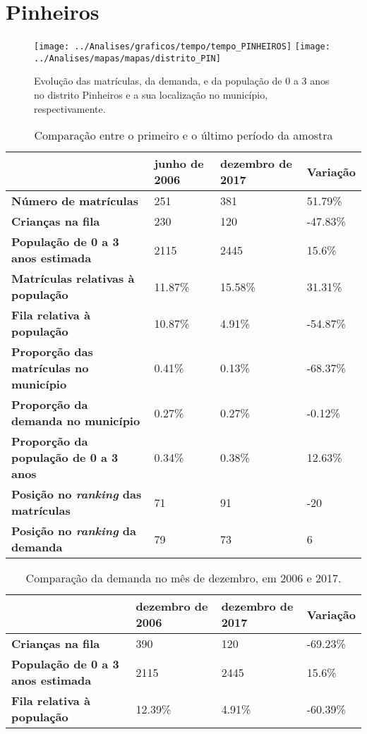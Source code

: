 \section{Pinheiros}
\begin{figure}[H]
	\centering
	\texttt{[image: ../Analises/graficos/tempo/tempo\_PINHEIROS]}
	\texttt{[image: ../Analises/mapas/mapas/distrito\_PIN]}
	\caption{Evolução das matrículas, da demanda, e da população de 0 a 3 anos no distrito Pinheiros e a sua localização no município, respectivamente.}
\end{figure}
\begin{table}[H]
	\begin{tabular}{|l|l|l|l|}
		\hline
		\textbf{}                                      & \textbf{junho de 2006}       & \textbf{dezembro de 2017}    & \textbf{Variação} \\ \hline
		\textbf{Número de matrículas}                  & 251 & 381 & 51.79\% \\ \hline
		\textbf{Crianças na fila}                      & 230 & 120 & -47.83\% \\ \hline
		\textbf{População de 0 a 3 anos estimada}      & 2115 & 2445 & 15.6\% \\ \hline
		\textbf{Matrículas relativas à população}      & 11.87\% & 15.58\% & 31.31\% \\ \hline
		\textbf{Fila relativa à população}             & 10.87\% & 4.91\% & -54.87\% \\ \hline
		\textbf{Proporção das matrículas no município} & 0.41\% & 0.13\% & -68.37\% \\ \hline
		\textbf{Proporção da demanda no município}     & 0.27\% & 0.27\% & -0.12\% \\ \hline
		\textbf{Proporção da população de 0 a 3 anos}  & 0.34\% & 0.38\% & 12.63\% \\ \hline
		\textbf{Posição no \textit{ranking} das matrículas}     & 71 & 91 & -20 \\ \hline
		\textbf{Posição no \textit{ranking} da demanda}         & 79 & 73 & 6 \\ \hline
	\end{tabular}
	\caption{Comparação entre o primeiro e o último período da amostra}
\end{table}
\begin{table}[H]
	\begin{tabular}{|l|l|l|l|}
		\hline
		\textbf{}                                 & \textbf{dezembro de 2006} & \textbf{dezembro de 2017} & \textbf{Variação} \\ \hline
		\textbf{Crianças na fila}                      & 390 & 120 & -69.23\% \\ \hline
		\textbf{População de 0 a 3 anos estimada}      & 2115 & 2445 & 15.6\% \\ \hline
		\textbf{Fila relativa à população}             & 12.39\% & 4.91\% & -60.39\% \\ \hline
	\end{tabular}
	\caption{Comparação da demanda no mês de dezembro, em 2006 e 2017.}
\end{table}
